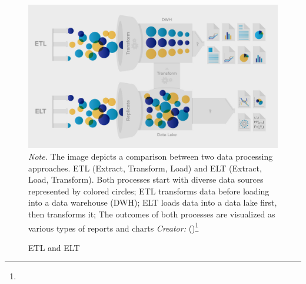 \begin{figure}[H]
\caption{ETL and ELT}
\centering
\includegraphics[width=1\linewidth]{images/ETL-ELT.png}
\small
\textit{Note.} The image depicts a comparison between two data processing approaches. ETL (Extract, Transform, Load) and ELT (Extract, Load, Transform). Both processes start with diverse data sources represented by colored circles; ETL transforms data before loading into a data warehouse (DWH); ELT loads data into a data lake first, then transforms it; The outcomes of both processes are visualized as various types of reports and charts
\textit{Creator:} (\cite{etleltDatacamp})\footnote[22]{}
\end{figure}
